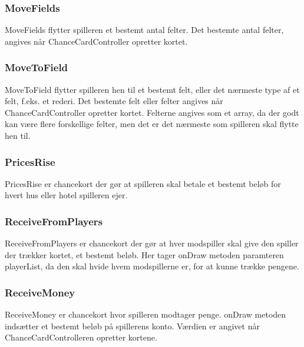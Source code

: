 \subsubsection{MoveFields}
MoveFields flytter spilleren et bestemt antal felter. Det bestemte antal felter, angives når ChanceCardController opretter kortet. 

\subsubsection{MoveToField}
MoveToField flytter spilleren hen til et bestemt felt, eller det nærmeste type af et felt, f.eks. et rederi. Det bestemte felt eller felter angives når ChanceCardController opretter kortet. Felterne angives som et array, da der godt kan være flere forskellige felter, men det er det nærmeste som spilleren skal flytte hen til.

\subsubsection{PricesRise}
PricesRise er chancekort der gør at spilleren skal betale et bestemt beløb for hvert hus eller hotel spilleren ejer. 

\subsubsection{ReceiveFromPlayers}
ReceiveFromPlayers er chancekort der gør at hver modspiller skal give den spiller der trækker kortet, et bestemt beløb. Her tager onDraw metoden paramteren playerList, da den skal hvide hvem modspillerne er, for at kunne trække pengene.

\subsubsection{ReceiveMoney}
ReceiveMoney er chancekort hvor spilleren modtager penge. onDraw metoden indsætter et bestemt beløb på spillerens konto. Værdien er angivet når ChanceCardControlleren opretter kortene.

